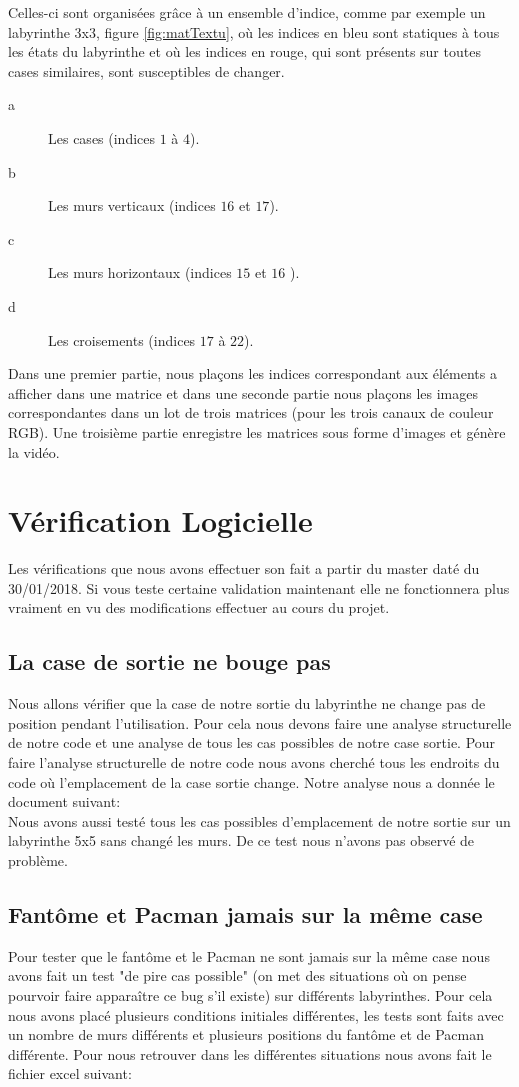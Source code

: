  Celles-ci sont organisées grâce à un ensemble d'indice, comme par exemple un labyrinthe 3x3, figure \ref{fig:matTextu}, où les indices en bleu sont statiques à tous les états du labyrinthe et où les indices en rouge, qui sont présents sur toutes cases similaires, sont susceptibles de changer. 
 \begin{description}
 \item[a] Les cases (indices $1$ à $4$).
 \item[b] Les murs verticaux (indices $16$ et $17$).
 \item[c] Les murs horizontaux (indices $15$ et $16$ ).
 \item[d] Les croisements (indices $17$ à $22$).
 \end{description}
 Dans une premier partie, nous plaçons les indices correspondant aux éléments a afficher dans une matrice et dans une seconde partie nous plaçons les images correspondantes dans un lot de trois matrices (pour les trois canaux de couleur RGB). Une troisième partie enregistre les matrices sous forme d'images et génère la vidéo.

 \section{Vérification Logicielle}
Les vérifications que nous avons effectuer son fait a partir du master daté du 30/01/2018. Si vous teste certaine validation maintenant elle ne fonctionnera plus vraiment en vu des modifications effectuer au cours du projet. 
\subsection{La case de sortie ne bouge pas}
Nous allons vérifier que la case de notre sortie du labyrinthe ne change pas de position pendant l'utilisation. Pour cela nous devons faire une analyse structurelle de notre code et une analyse de tous les cas possibles de notre case sortie. Pour faire l'analyse structurelle de notre code nous avons cherché tous les endroits du code où l'emplacement de la case sortie change. Notre analyse nous a donnée le document suivant:\\
Nous avons aussi testé tous les cas possibles d'emplacement de notre sortie sur un labyrinthe 5x5 sans changé les murs. De ce test nous n'avons pas observé de problème.

\subsection{Fantôme et Pacman jamais sur la même case}
Pour tester que le fantôme et le Pacman ne sont jamais sur la même case nous avons fait un test "de pire cas possible" (on met des situations où on pense pourvoir faire apparaître ce bug s'il existe) sur différents labyrinthes. Pour cela nous avons placé plusieurs conditions initiales différentes, les tests sont faits avec un nombre de murs différents et plusieurs positions du fantôme et de Pacman différente. Pour nous retrouver dans les différentes situations nous avons fait le fichier excel suivant:\\


